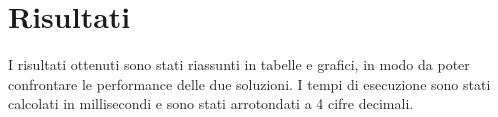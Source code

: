
\section{Risultati}

I risultati ottenuti sono stati riassunti in tabelle e grafici, in modo da poter confrontare le performance delle due soluzioni. I tempi di esecuzione sono stati calcolati in millisecondi e sono stati arrotondati a 4 cifre decimali.



